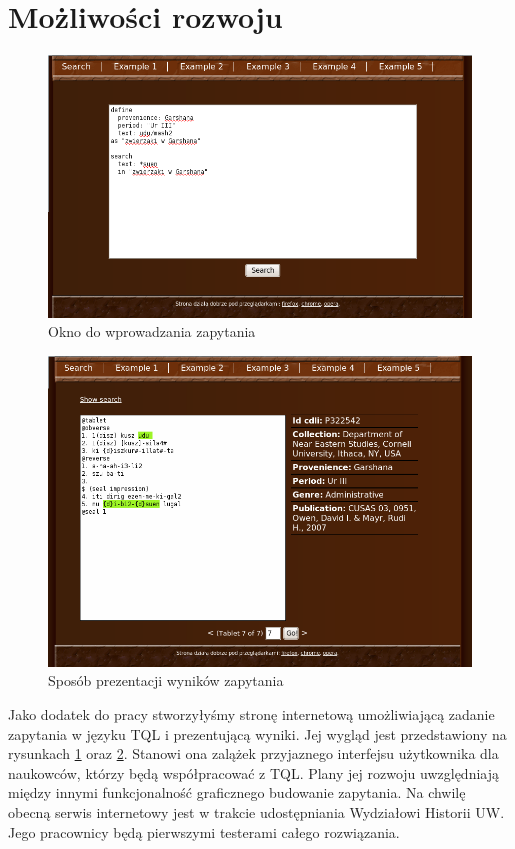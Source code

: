\section*{Możliwości rozwoju}
\begin{figure}[h]
 \centering
 \includegraphics[width=450px]{../diagramy/wyszuk_zapyt.png}
 \caption{Okno do wprowadzania zapytania}
 \label{fig:wyszuk_zapyt}
\end{figure}

\begin{figure}[h]
 \centering
 \includegraphics[width=450px]{../diagramy/wyszuk_wynik.png}
 \caption{Sposób prezentacji wyników zapytania}
 \label{fig:wyszuk_wynik}
\end{figure}

Jako dodatek do pracy stworzyłyśmy stronę internetową umożliwiającą zadanie zapytania w języku TQL i prezentującą wyniki. 
Jej wygląd jest przedstawiony na rysunkach \ref{fig:wyszuk_zapyt} oraz \ref{fig:wyszuk_wynik}.
Stanowi ona zalążek przyjaznego interfejsu użytkownika dla naukowców, którzy będą współpracować z TQL. Plany jej rozwoju
uwzględniają między innymi funkcjonalność graficznego budowanie zapytania.
Na chwilę obecną serwis internetowy jest w trakcie udostępniania Wydziałowi Historii UW.
Jego pracownicy będą pierwszymi testerami całego rozwiązania.

